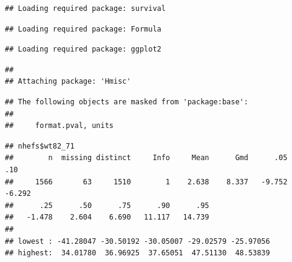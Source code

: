 \documentclass[
  10pt,
]{book}
\newenvironment{Shaded}{\begin{snugshade}}{\end{snugshade}}
\newcommand{\DecValTok}[1]{\textcolor[rgb]{0.00,0.00,0.81}{#1}}
\newcommand{\KeywordTok}[1]{\textcolor[rgb]{0.13,0.29,0.53}{\textbf{#1}}}
\newcommand{\NormalTok}[1]{#1}
\newcommand{\OperatorTok}[1]{\textcolor[rgb]{0.81,0.36,0.00}{\textbf{#1}}}
\begin{document}
\begin{verbatim}
## Loading required package: survival
\end{verbatim}

\begin{verbatim}
## Loading required package: Formula
\end{verbatim}

\begin{verbatim}
## Loading required package: ggplot2
\end{verbatim}

\begin{verbatim}
## 
## Attaching package: 'Hmisc'
\end{verbatim}

\begin{verbatim}
## The following objects are masked from 'package:base':
## 
##     format.pval, units
\end{verbatim}

\begin{Shaded}
\end{Shaded}

\begin{verbatim}
## nhefs$wt82_71 
##        n  missing distinct     Info     Mean      Gmd      .05      .10 
##     1566       63     1510        1    2.638    8.337   -9.752   -6.292 
##      .25      .50      .75      .90      .95 
##   -1.478    2.604    6.690   11.117   14.739 
## 
## lowest : -41.28047 -30.50192 -30.05007 -29.02579 -25.97056
## highest:  34.01780  36.96925  37.65051  47.51130  48.53839
\end{verbatim}
\end{document}
